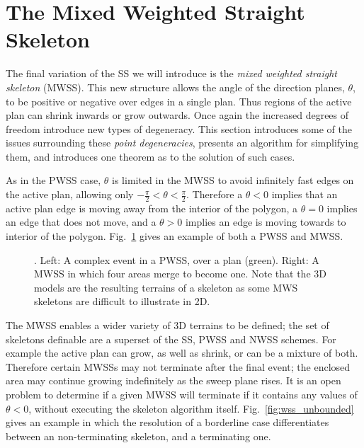 
\section{The Mixed Weighted Straight Skeleton}
\label{sec:mwss}


The final variation of the SS we will introduce is the \emph{mixed weighted straight skeleton} (MWSS). This new structure allows the angle of the direction planes, $\theta$, to be positive or negative over edges in a single plan. Thus regions of the active plan can shrink inwards or grow outwards. Once again the increased degrees of freedom introduce new types of degeneracy. This section introduces some of the issues surrounding these \emph{point degeneracies}, presents an algorithm for simplifying them, and introduces one theorem as to the solution of such cases.

As in the PWSS case, $\theta$ is limited in the MWSS to avoid infinitely fast edges on the active plan, allowing only  $-\frac{\pi}{2} < \theta < \frac{\pi}{2}$. Therefore a $\theta < 0$ implies that an active plan edge is moving away from the interior of the polygon, a $\theta = 0$ implies an edge that does not move, and a $\theta > 0$ implies an edge is moving towards to interior of the polygon. Fig.~\ref{fig:wss_strange} gives an example of both a PWSS and MWSS.

\begin{figure}
  \centering
  \def\svgwidth{1.0\columnwidth}
  
  \caption[Degenerate events in the PWSS and MWSS]{\label{fig:wss_strange}. Left: A complex event in a PWSS, over a plan (green). Right: A MWSS in which four areas merge to become one. Note that the 3D models are the resulting terrains of a skeleton as some MWS skeletons are difficult to illustrate in 2D.}
\end{figure}

The MWSS enables a wider variety of 3D terrains to be defined; the set of skeletons definable are a superset of the SS, PWSS and NWSS schemes. For example the active plan can grow, as well as shrink, or can be a mixture of both. Therefore certain MWSSs may not terminate after the final event; the enclosed area may continue growing indefinitely as the sweep plane rises. It is an open problem to determine if a given MWSS will terminate if it contains any values of $\theta < 0$, without executing the skeleton algorithm itself. Fig.~\ref{fig:wss_unbounded} gives an example in which the resolution of a borderline case differentiates between an non-terminating skeleton, and a terminating one.

